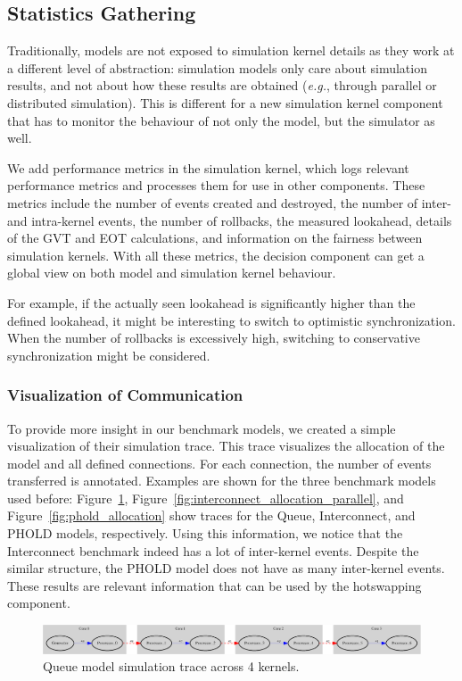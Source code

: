 \subsection{Statistics Gathering}
Traditionally, models are not exposed to simulation kernel details as they work at a different level of abstraction:
simulation models only care about simulation results, and not about how these results are obtained (\textit{e.g.}, through parallel or distributed simulation).
This is different for a new simulation kernel component that has to monitor the behaviour of not only the model, but the simulator as well.

We add performance metrics in the simulation kernel, which logs relevant performance metrics and processes them for use in other components.
These metrics include the number of events created and destroyed, the number of inter- and intra-kernel events, the number of rollbacks, the measured lookahead, details of the GVT and EOT calculations, and information on the fairness between simulation kernels.
With all these metrics, the decision component can get a global view on both model and simulation kernel behaviour.

For example, if the actually seen lookahead is significantly higher than the defined lookahead, it might be interesting to switch to optimistic synchronization.
When the number of rollbacks is excessively high, switching to conservative synchronization might be considered.

\subsubsection{Visualization of Communication}
To provide more insight in our benchmark models, we created a simple visualization of their simulation trace.
This trace visualizes the allocation of the model and all defined connections.
For each connection, the number of events transferred is annotated.
Examples are shown for the three benchmark models used before: Figure~\ref{fig:Queue_allocation}, Figure~\ref{fig:interconnect_allocation_parallel}, and Figure~\ref{fig:phold_allocation} show traces for the Queue, Interconnect, and PHOLD models, respectively.
Using this information, we notice that the Interconnect benchmark indeed has a lot of inter-kernel events.
Despite the similar structure, the PHOLD model does not have as many inter-kernel events.
These results are relevant information that can be used by the hotswapping component.

\begin{figure}
    \center
    \includegraphics[width=\textwidth ]{fig/queue_allocation.eps}
    \caption{Queue model simulation trace across 4 kernels.}
    \label{fig:Queue_allocation}
\end{figure}

